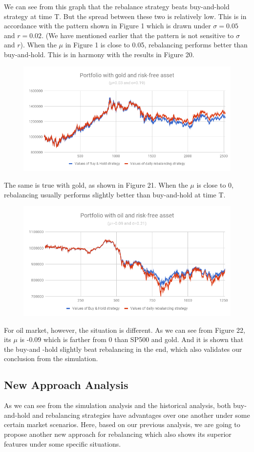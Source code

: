 \documentclass[
10pt, %
a4paper, %
oneside, %
headinclude,footinclude, %
BCOR5mm, %
]{scrartcl}
\begin{document}
We can see from this graph that the rebalance strategy beats buy-and-hold strategy at time T. But the spread between these two is relatively low. This is in accordance with the pattern shown in Figure 1 which is drawn under $\sigma = 0.05$ and $r = 0.02$. (We have mentioned earlier that the pattern is not sensitive to $\sigma$ and $r$). When the $\mu$ in Figure 1 is close to 0.05, rebalancing performs better than buy-and-hold. This is in harmony with the results in Figure 20.\\

\begin{figure}[H]
	\centering
	\includegraphics[width=0.7\linewidth]{gold}
	\caption{}
	\label{fig:gold}
\end{figure}

The same is true with gold, as shown in Figure 21. When the $\mu$ is close to 0, rebalancing usually performs slightly better than buy-and-hold at time T.\\

\begin{figure}[H]
	\centering
	\includegraphics[width=0.7\linewidth]{oil}
	\caption{}
	\label{fig:oil}
\end{figure}

For oil market, however, the situation is different. As we can see from Figure 22, its $\mu$ is -0.09 which is farther from 0 than SP500 and gold. And it is shown that the buy-and -hold slightly beat rebalancing in the end, which also validates our conclusion from the simulation.

\subsection{New Approach Analysis}
As we can see from the simulation analysis and the historical analysis, both buy-and-hold and rebalancing strategies have advantages over one another under some certain market scenarios. Here, based on our previous analysis, we are going to propose another new approach for rebalancing which also shows its superior features under some specific situations.\\
\end{document}
